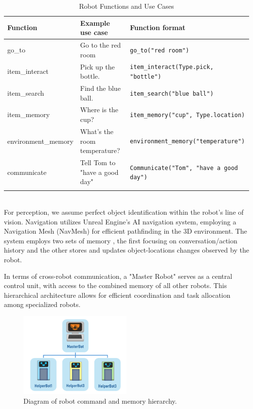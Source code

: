 \documentclass[pdflatex,sn-mathphys-num]{sn-jnl}
\theoremstyle{thmstyleone}
\theoremstyle{thmstyletwo}%
\theoremstyle{thmstylethree}%
\begin{document}
\begin{table}[h]
\caption{Robot Functions and Use Cases}\label{robot-functions}
\begin{tabular*}{\textwidth}{p{72pt}p{113pt}p{60pt}}
\toprule
Function & Example use case & Function format \\
\midrule
go\_to & Go to the red room & \verb|go_to("red room")| \\
item\_interact & Pick up the bottle. & \verb|item_interact(Type.pick, "bottle")| \\
item\_search & Find the blue ball. & \verb|item_search("blue ball")| \\
item\_memory & Where is the cup? & \verb|item_memory("cup", Type.location)| \\
environment\_memory & What's the room temperature? & \verb|environment_memory("temperature")| \\
communicate & Tell Tom to "have a good day" & \verb|Communicate("Tom", "have a good day")| \\
\botrule
\end{tabular*}
\end{table}
\\For perception, we assume perfect object identification within the robot's line of vision. Navigation utilizes Unreal Engine's AI navigation system, employing a Navigation Mesh (NavMesh) for efficient pathfinding in the 3D environment.
The system employs two sets of memory , the first focusing on conversation/action history and the other stores and updates object-locations changes observed by the robot.

In terms of cross-robot communication, a "Master Robot" serves as a central control unit, with access to the combined memory of all other robots. This hierarchical architecture allows for efficient coordination and task allocation among specialized robots.

\begin{figure}[H]
\centering
\includegraphics[width=0.5\textwidth]{figures/Picture6.png}
\caption{Diagram of robot command and memory hierarchy.}\label{hierarchy}
\end{figure}
\end{document}
